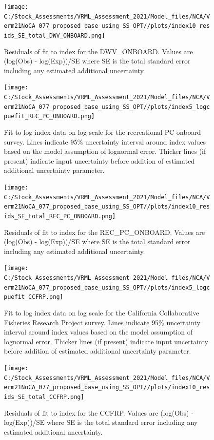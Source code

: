 \documentclass[
  english,
  a4paper,
]{article}
\begin{document}
\begin{figure}
\centering
\texttt{[image: C:/Stock\_Assessments/VRML\_Assessment\_2021/Model\_files/NCA/Verm21NoCA\_077\_proposed\_base\_using\_SS\_OPT//plots/index10\_resids\_SE\_total\_DWV\_ONBOARD.png]}
\caption{Residuals of fit to index for the DWV\_ONBOARD. Values are (log(Obs) - log(Exp))/SE where SE is the total standard error including any estimated additional uncertainty.\label{fig:cpue-resid-DWV-ONBOARD}}
\end{figure}

\begin{figure}
\centering
\texttt{[image: C:/Stock\_Assessments/VRML\_Assessment\_2021/Model\_files/NCA/Verm21NoCA\_077\_proposed\_base\_using\_SS\_OPT//plots/index5\_logcpuefit\_REC\_PC\_ONBOARD.png]}
\caption{Fit to log index data on log scale for the recreational PC onboard survey. Lines indicate 95\% uncertainty interval around index values based on the model assumption of lognormal error. Thicker lines (if present) indicate input uncertainty before addition of estimated additional uncertainty parameter.\label{fig:log-cpue-REC-PC-ONBOARD}}
\end{figure}

\begin{figure}
\centering
\texttt{[image: C:/Stock\_Assessments/VRML\_Assessment\_2021/Model\_files/NCA/Verm21NoCA\_077\_proposed\_base\_using\_SS\_OPT//plots/index10\_resids\_SE\_total\_REC\_PC\_ONBOARD.png]}
\caption{Residuals of fit to index for the REC\_PC\_ONBOARD. Values are (log(Obs) - log(Exp))/SE where SE is the total standard error including any estimated additional uncertainty.\label{fig:cpue-resid-REC-PC-ONBOARD}}
\end{figure}

\begin{figure}
\centering
\texttt{[image: C:/Stock\_Assessments/VRML\_Assessment\_2021/Model\_files/NCA/Verm21NoCA\_077\_proposed\_base\_using\_SS\_OPT//plots/index5\_logcpuefit\_CCFRP.png]}
\caption{Fit to log index data on log scale for the California Collaborative Fisheries Research Project survey. Lines indicate 95\% uncertainty interval around index values based on the model assumption of lognormal error. Thicker lines (if present) indicate input uncertainty before addition of estimated additional uncertainty parameter.\label{fig:log-cpue-CCFRP}}
\end{figure}

\begin{figure}
\centering
\texttt{[image: C:/Stock\_Assessments/VRML\_Assessment\_2021/Model\_files/NCA/Verm21NoCA\_077\_proposed\_base\_using\_SS\_OPT//plots/index10\_resids\_SE\_total\_CCFRP.png]}
\caption{Residuals of fit to index for the CCFRP. Values are (log(Obs) - log(Exp))/SE where SE is the total standard error including any estimated additional uncertainty.\label{fig:cpue-resid-CCFRP}}
\end{figure}
\end{document}
